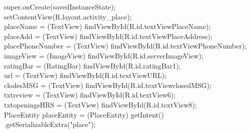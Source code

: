 \documentclass[12pt,a4paper]{article}
\begin{document}
{{{		super.onCreate(savedInstanceState);\\
		setContentView(R.layout.activity_place);\\
		placeName = (TextView) findViewById(R.id.textViewPlaceName);\\
		placeAdd = (TextView) findViewById(R.id.textViewPlaceAddress);\\
		placePhoneNumber = (TextView) findViewById(R.id.textViewPhoneNumber);\\
		imageView = (ImageView) findViewById(R.id.serverImageView);\\
		ratingBar = (RatingBar) findViewById(R.id.ratingBar1);\\
		url = (TextView) findViewById(R.id.textViewURL);\\
		clodesMSG = (TextView) findViewById(R.id.textViewclosedMSG);\\

		txtreview = (TextView) findViewById(R.id.textView6);\\
		txtopeningsHRS = (TextView) findViewById(R.id.textView8);\\

		PlaceEntity placeEntity = (PlaceEntity) getIntent()
				.getSerializableExtra("place");\\

}}}
\end{document}
